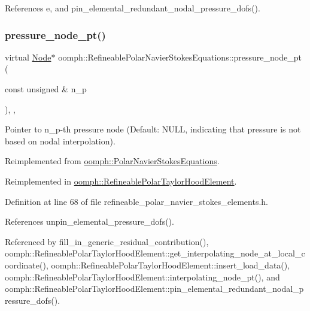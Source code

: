 References e, and pin\+\_\+elemental\+\_\+redundant\+\_\+nodal\+\_\+pressure\+\_\+dofs().

\mbox{\label{classoomph_1_1RefineablePolarNavierStokesEquations_a83ec74f6d0ecc0b120149a1dad682486}} 
\subsubsection{\texorpdfstring{pressure\+\_\+node\+\_\+pt()}{pressure\_node\_pt()}}
{\footnotesize\ttfamily virtual \hyperlink{classoomph_1_1Node}{Node}$\ast$ oomph\+::\+Refineable\+Polar\+Navier\+Stokes\+Equations\+::pressure\+\_\+node\+\_\+pt (\begin{DoxyParamCaption}\item[{const unsigned \&}]{n\+\_\+p }\end{DoxyParamCaption})\hspace{0.3cm}{\ttfamily [inline]}, {\ttfamily [protected]}, {\ttfamily [virtual]}}



Pointer to n\+\_\+p-\/th pressure node (Default\+: N\+U\+LL, indicating that pressure is not based on nodal interpolation). 



Reimplemented from \hyperlink{classoomph_1_1PolarNavierStokesEquations_ae87e3863f67fb6cceb6b0e74a360febe}{oomph\+::\+Polar\+Navier\+Stokes\+Equations}.



Reimplemented in \hyperlink{classoomph_1_1RefineablePolarTaylorHoodElement_a327a296af13c5c7346fdfd06b4da7bd8}{oomph\+::\+Refineable\+Polar\+Taylor\+Hood\+Element}.



Definition at line 68 of file refineable\+\_\+polar\+\_\+navier\+\_\+stokes\+\_\+elements.\+h.



References unpin\+\_\+elemental\+\_\+pressure\+\_\+dofs().



Referenced by fill\+\_\+in\+\_\+generic\+\_\+residual\+\_\+contribution(), oomph\+::\+Refineable\+Polar\+Taylor\+Hood\+Element\+::get\+\_\+interpolating\+\_\+node\+\_\+at\+\_\+local\+\_\+coordinate(), oomph\+::\+Refineable\+Polar\+Taylor\+Hood\+Element\+::insert\+\_\+load\+\_\+data(), oomph\+::\+Refineable\+Polar\+Taylor\+Hood\+Element\+::interpolating\+\_\+node\+\_\+pt(), and oomph\+::\+Refineable\+Polar\+Taylor\+Hood\+Element\+::pin\+\_\+elemental\+\_\+redundant\+\_\+nodal\+\_\+pressure\+\_\+dofs().

